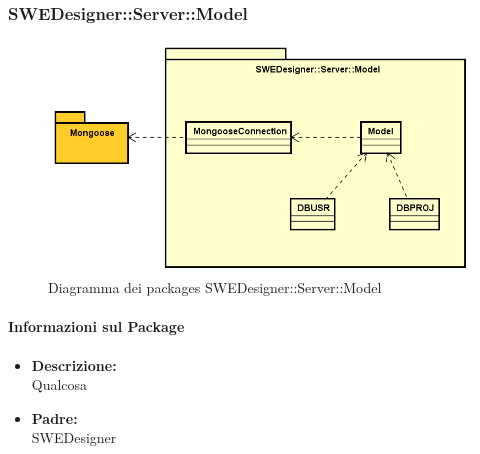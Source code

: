 		\subsubsection{SWEDesigner::Server::Model}
		 \begin{figure}[h!]
		\centering
		\includegraphics[scale=0.4]{Disegnetti/SWEDesigner__Server__Model.png}
		\caption{Diagramma dei packages SWEDesigner::Server::Model}
 		\end{figure}
		\paragraph{Informazioni sul Package}
		\begin{itemize}				
			\item \textbf{Descrizione: }\\
			Qualcosa
			\item \textbf{Padre: }\\ SWEDesigner
		\end{itemize}
		
